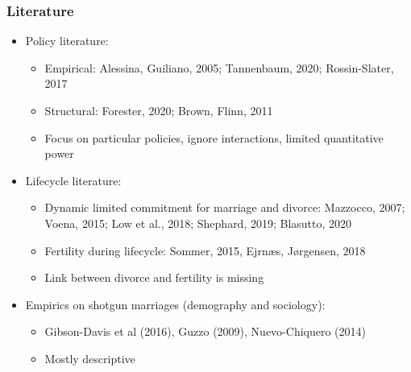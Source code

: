\documentclass[aspectratio=169]{beamer}
\let\olditem\item
\renewcommand{\item}{%
\olditem\vspace{\fill}}
\begin{document}
\begin{frame}
\frametitle{Literature}
\begin{itemize}
\item Policy literature:
\begin{itemize}
\item Empirical: Alessina, Guiliano, 2005;  Tannenbaum, 2020; Rossin-Slater, 2017
\item Structural: Forester, 2020; Brown, Flinn, 2011
\item Focus on particular policies, ignore interactions, limited quantitative power
\end{itemize}
\item Lifecycle literature:
\begin{itemize}
\item Dynamic limited commitment for marriage and divorce: Mazzocco, 2007; Voena, 2015; Low et al., 2018; Shephard, 2019; Blasutto, 2020
\item Fertility during lifecycle: Sommer, 2015, Ejrnæs, Jørgensen, 2018
\item Link between divorce and fertility is missing
\end{itemize}
\item Empirics on shotgun marriages (demography and sociology):
\begin{itemize}
\item Gibson-Davis et al (2016), Guzzo (2009),  Nuevo-Chiquero (2014)
\item Mostly descriptive
\end{itemize}
\end{itemize}
%
\end{frame}
\end{document}
